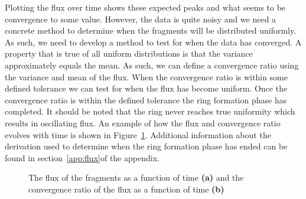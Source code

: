 \documentclass[a4paper, 12pt]{article}
\begin{document}
Plotting the flux over time shows these expected peaks and what seems to be convergence to some value. However, the data is quite noisy and we need a concrete method to determine when the fragments will be distributed uniformly. As such, we need to develop a method to test for when the data has converged. A property that is true of all uniform distributions is that the variance approximately equals the mean. As such, we can define a convergence ratio using the variance and mean of the flux. When the convergence ratio is within some defined tolerance we can test for when the flux has become uniform. Once the convergence ratio is within the defined tolerance the ring formation phase has completed. It should be noted that the ring never reaches true uniformity which results in oscillating flux. An example of how the flux and convergence ratio evolves with time is shown in Figure~\ref{flux_plots}. Additional information about the derivation used to determine when the ring formation phase has ended can be found in section~\ref{app:flux}of the appendix.

\begin{figure}[t]
	\begin{adjustbox}{max width=1\linewidth,center}
		\centering     %
	\end{adjustbox}
	\caption{The flux of the fragments as a function of time \textbf{(a)} and the convergence ratio of the flux as a function of time \textbf{(b)} }
	\label{flux_plots}
\end{figure}
\end{document}
